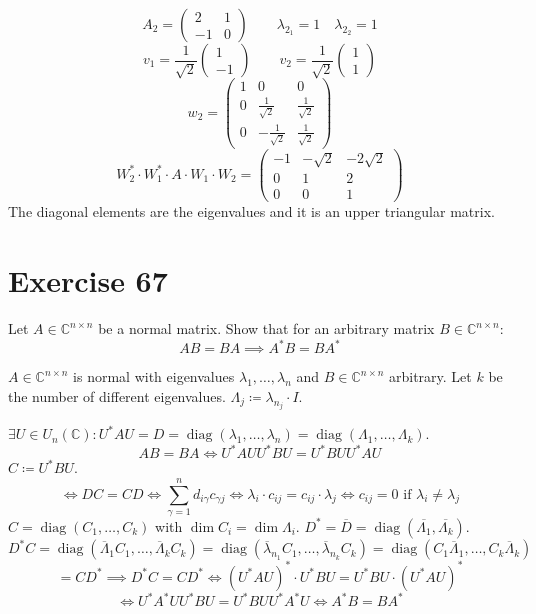 \documentclass[a4paper]{article}
\theoremstyle{definition}
\begin{document}
\[ A_2 = \begin{pmatrix} 2 & 1 \\ -1 & 0 \end{pmatrix} \qquad \lambda_{2_1} = 1 \quad \lambda_{2_2} = 1 \]
\[ v_1 = \frac{1}{\sqrt2} \begin{pmatrix} 1 \\ -1 \end{pmatrix} \qquad v_2 = \frac{1}{\sqrt2} \begin{pmatrix} 1 \\ 1 \end{pmatrix} \]
\[
  w_2 = \begin{pmatrix}
    1 & 0 & 0 \\
    0 & \frac1{\sqrt2} & \frac1{\sqrt{2}} \\
    0 & -\frac1{\sqrt2} & \frac1{\sqrt2}
  \end{pmatrix}
\] \[
  W^*_2 \cdot W_1^* \cdot A \cdot W_1 \cdot W_2 = \begin{pmatrix}
    -1 & -\sqrt{2} & -2 \sqrt2 \\
    0 & 1 & 2 \\
    0 & 0 & 1
  \end{pmatrix}
\]
The diagonal elements are the eigenvalues and it is an upper triangular matrix.

\section*{Exercise 67}
\begin{ex}
  Let $A \in \mathbb C^{n \times n}$ be a normal matrix.
  Show that for an arbitrary matrix $B \in \mathbb C^{n \times n}$:
  \[ AB = BA \implies A^* B = BA^* \]
\end{ex}

$A \in \mathbb C^{n \times n}$ is normal with eigenvalues $\lambda_1, \dots, \lambda_n$ and $B \in \mathbb C^{n \times n}$ arbitrary.
Let $k$ be the number of different eigenvalues. $\Lambda_j \coloneqq \lambda_{n_j} \cdot I$.

$\exists U \in U_n(\mathbb C): U^* AU = D = \operatorname{diag}(\lambda_1, \dots, \lambda_n) = \operatorname{diag}(\Lambda_1, \dots, \Lambda_k)$.
\[ AB = BA \iff U^* AU U^* BU = U^* B UU^* AU \]
$C \coloneqq U^* B U$.
\[ \iff DC = CD \iff \sum_{\gamma=1}^n d_{i\gamma} c_{\gamma j} \iff \lambda_i \cdot c_{ij} = c_{ij} \cdot \lambda_j \iff c_{ij} = 0 \text{ if } \lambda_i \neq \lambda_j \]
$C = \operatorname{diag}(C_1, \dots, C_k)$ with $\dim{C_i} = \dim{\Lambda_i}$.
$D^* = \overline{D} = \operatorname{diag}(\overline{\Lambda_1}, \overline{\Lambda_k})$.
\[ D^* C = \operatorname{diag}(\overline\Lambda_1 C_1, \dots, \overline\Lambda_k C_k) = \operatorname{diag}(\overline \lambda_{n_1} C_1, \dots, \overline{\lambda}_{n_k} C_k) = \operatorname{diag}(C_1 \overline\Lambda_1, \dots, C_k \overline\Lambda_k) \]
\[ = CD^* \implies D^* C = CD^* \iff (U^* AU)^* \cdot U^* BU = U^* BU \cdot (U^* AU)^* \]
\[ \iff U^* A^* U U^* B U = U^* BUU^* A^* U \iff A^* B = BA^* \]
\end{document}
